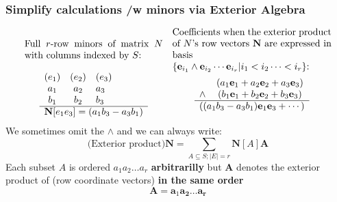 \documentclass{beamer}
\newcommand{\ext}[1]{\ensuremath{\mathbf{#1}}}
\begin{document}
\begin{frame}
  \frametitle{Simplify calculations /w minors via Exterior Algebra}
  \[
  \begin{array}{cc}
     \begin{minipage}{2in}Full $r$-row minors of matrix $N$ with columns indexed by $S$: 
     \end{minipage}
    &
     \begin{minipage}{2.3in}Coefficients when the exterior product of $N$'s row vectors $\ext{N}$
       are expressed in basis\\
       $\{\ext{e}_{i_1}\wedge\ext{e}_{i_2}\cdots\ext{e}_{i_r}|i_1<i_2\cdots<i_r\}$:
     \end{minipage}\\
    \begin{array}{ccl}
      (e_1) & (e_2) & (e_3) \\ 
      a_1 & a_2 & a_3 \\
      b_1 & b_2 & b_3 \\ \hline
      \multicolumn{3}{c}{\ext{N}[e_1e_3]=(a_1b_3-a_3b_1)}
    \end{array} 
    &
    \begin{array}{cc}
             & (a_1\mathbf{e}_1+a_2\mathbf{e}_2+a_3\mathbf{e}_3) \\
      \wedge & (b_1\mathbf{e}_1+b_2\mathbf{e}_2+b_3\mathbf{e}_3) \\ \hline
      \multicolumn{2}{c}{( 
      (a_1b_3-a_3b_1)\mathbf{e}_1\mathbf{e}_3 +
      \cdots
      )}
    \end{array} 
  \end{array}
  \]
  We sometimes omit the $\wedge$ and we can always write:
  \[
  \text{(Exterior product)} \ext{N} = \sum_{A\subseteq S; |E|=r}\ext{N}[A]\ext{A}
  \]
  Each subset $A$ is ordered $a_1 a_2 \ldots a_r$ \textbf{arbitrarilly} but $\ext{A}$
  denotes the exterior product of (row coordinate vectors) \textbf{in the same order}
  \[
  \ext{A} = \ext{a}_1\ext{a_2}\ldots\ext{a_r}
  \]
\end{frame}
\end{document}
